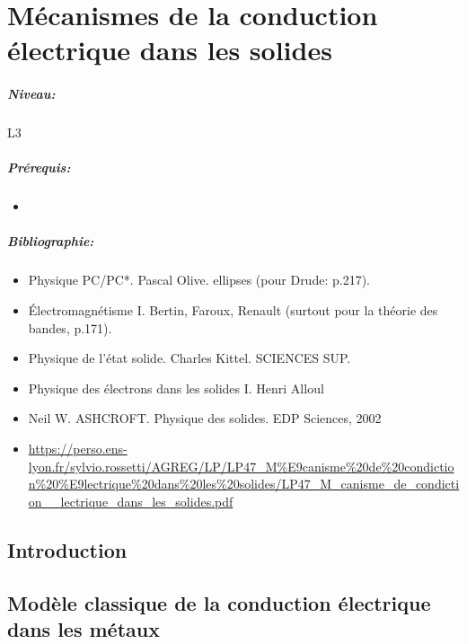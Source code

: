 \documentclass[11pt]{report}
\numberwithin{figure}{section}
\numberwithin{equation}{section}
\numberwithin{table}{section}
\newcommand{\1}{\boldsymbol{1}}
\begin{document}
\newpage




\chapter{Mécanismes de la conduction électrique dans les solides}


\paragraph*{Niveau:} L3

\paragraph*{Prérequis:} 
\begin{itemize}
\item 
\end{itemize}

\paragraph*{Bibliographie:}
\begin{itemize}
\item Physique PC/PC*. Pascal Olive. ellipses (pour Drude: p.217).
\item Électromagnétisme I. Bertin, Faroux, Renault (surtout pour la théorie des bandes, p.171).
\item Physique de l'état solide. Charles Kittel. SCIENCES SUP.
\item Physique des électrons dans les solides I. Henri Alloul
\item Neil W. ASHCROFT. Physique des solides. EDP Sciences, 2002
\item \url{https://perso.ens-lyon.fr/sylvio.rossetti/AGREG/LP/LP47_M%E9canisme%20de%20condiction%20%E9lectrique%20dans%20les%20solides/LP47_M_canisme_de_condiction__lectrique_dans_les_solides.pdf}
\end{itemize}

\section*{Introduction}
 
 
 
\section{Modèle classique de la conduction électrique dans les métaux}
\end{document}
